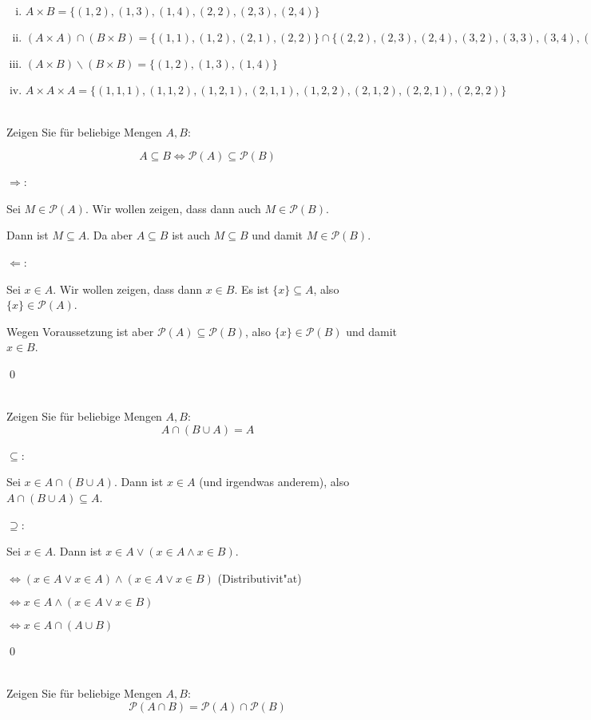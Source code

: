 \begin{loesung}
  \begin{enumerate}[(i)]
    \item $A\times B=\{(1,2),(1,3),(1,4),(2,2),(2,3),(2,4)\}$
    \item $(A\times A)\cap (B\times B)=\{(1,1),(1,2),(2,1),(2,2)\}\cap\{(2,2),(2,3),(2,4),(3,2),(3,3),(3,4),(4,2),(4,3),(4,4)\}=\{(2,2)\}$
    \item $(A\times B)\backslash (B\times B)=\{(1,2),(1,3),(1,4)\}$
    \item $A\times A\times A=\{(1,1,1),(1,1,2),(1,2,1),(2,1,1),(1,2,2),(2,1,2),(2,2,1),(2,2,2)\}$
  \end{enumerate}
\end{loesung}

\\
Zeigen Sie für beliebige Mengen $A,B$:

  \[A\subseteq B\Leftrightarrow \mathscr{P}(A)\subseteq\mathscr{P}(B)\]


\begin{loesung}
  \glqq$\Rightarrow$\grqq:

  Sei $M\in\mathscr{P}(A)$. Wir wollen zeigen, dass dann auch $M\in\mathscr{P}(B)$.
  
  Dann ist $M\subseteq A$. Da aber $A\subseteq B$ ist auch $M\subseteq B$ und damit $M\in\mathscr{P}(B)$.

  \glqq$\Leftarrow$\grqq:

  Sei $x\in A$. Wir wollen zeigen, dass dann $x\in B$. Es ist $\{x\}\subseteq A$, also $\{x\}\in\mathscr{P}(A)$.
  
  Wegen Voraussetzung ist aber $\mathscr{P}(A)\subseteq\mathscr{P}(B)$, also $\{x\}\in\mathscr{P}(B)$ und damit $x\in B$. 

  \qed
\end{loesung}
\\
Zeigen Sie für beliebige Mengen $A,B$:
\[A\cap (B\cup A)=A\]

\begin{loesung}
\glqq$\subseteq$\grqq:

Sei $x\in A\cap(B\cup A)$. Dann ist $x\in A$ (und irgendwas anderem), also $A\cap(B\cup A)\subseteq A$.

\glqq$\supseteq$\grqq:

Sei $x\in A$. Dann ist $x\in A\vee (x\in A\wedge x\in B)$.

$\Leftrightarrow (x\in A\vee x\in A)\wedge (x\in A\vee x\in B)$ (Distributivit"at)

$\Leftrightarrow x\in A\wedge (x\in A\vee x\in B)$

$\Leftrightarrow x\in A\cap(A\cup B)$

\qed
\end{loesung}
\\
Zeigen Sie für beliebige Mengen $A,B$:
\[\mathscr{P}(A\cap B)=\mathscr{P}(A)\cap\mathscr{P}(B)\]

